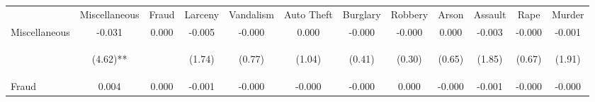 \begin{tabular}{lccccccccccc}
\hline\hline \noalign{\smallskip} & Miscellaneous & Fraud & Larceny & Vandalism & Auto Theft & Burglary & Robbery & Arson & Assault & Rape & Murder\\
\noalign{\smallskip}\hline \noalign{\smallskip}Miscellaneous & -0.031 & 0.000 & -0.005 & -0.000 & 0.000 & -0.000 & -0.000 & 0.000 & -0.003 & -0.000 & -0.001\\
 & \begin{footnotesize}(4.62)**\end{footnotesize} & \begin{footnotesize}\end{footnotesize} & \begin{footnotesize}(1.74)\end{footnotesize} & \begin{footnotesize}(0.77)\end{footnotesize} & \begin{footnotesize}(1.04)\end{footnotesize} & \begin{footnotesize}(0.41)\end{footnotesize} & \begin{footnotesize}(0.30)\end{footnotesize} & \begin{footnotesize}(0.65)\end{footnotesize} & \begin{footnotesize}(1.85)\end{footnotesize} & \begin{footnotesize}(0.67)\end{footnotesize} & \begin{footnotesize}(1.91)\end{footnotesize}\\
\noalign{\smallskip}Fraud & 0.004 & 0.000 & -0.001 & -0.000 & -0.000 & -0.000 & 0.000 & -0.000 & -0.001 & -0.000 & -0.000\\

\end{tabular}
